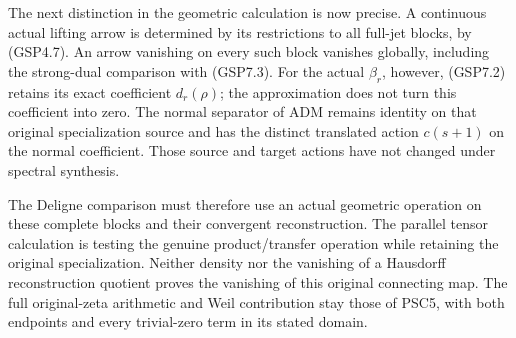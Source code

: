 The next distinction in the geometric calculation is now precise. A
continuous actual lifting arrow is determined by its restrictions to all
full-jet blocks, by (GSP4.7). An arrow vanishing on every such block
vanishes globally, including the strong-dual comparison with (GSP7.3).
For the actual \(\beta_r\), however, (GSP7.2) retains its exact
coefficient \(d_r(\rho)\); the approximation does not turn this
coefficient into zero. The normal separator of ADM remains identity on
that original specialization source and has the distinct translated
action \(c(s+1)\) on the normal coefficient. Those source and target
actions have not changed under spectral synthesis.

The Deligne comparison must therefore use an actual geometric operation
on these complete blocks and their convergent reconstruction. The
parallel tensor calculation is testing the genuine product/transfer
operation while retaining the original specialization. Neither density
nor the vanishing of a Hausdorff reconstruction quotient proves the
vanishing of this original connecting map. The full original-zeta
arithmetic and Weil contribution stay those of PSC5, with both endpoints
and every trivial-zero term in its stated domain.
